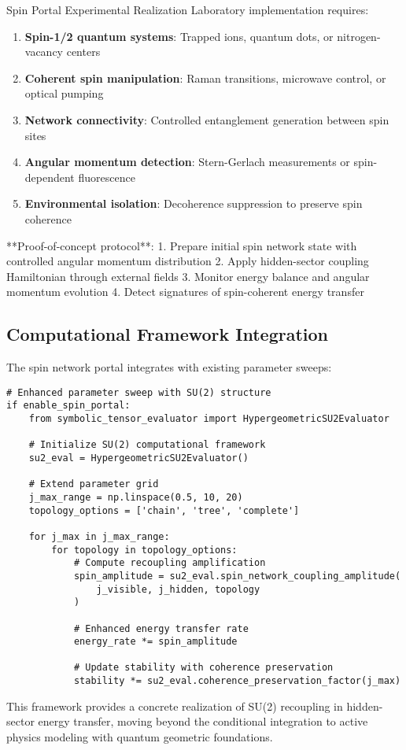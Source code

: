 \documentclass[12pt]{article}
\begin{document}
\begin{warningbox}{Spin Portal Experimental Realization}
Laboratory implementation requires:

\begin{enumerate}
\item \textbf{Spin-1/2 quantum systems}: Trapped ions, quantum dots, or nitrogen-vacancy centers
\item \textbf{Coherent spin manipulation}: Raman transitions, microwave control, or optical pumping
\item \textbf{Network connectivity}: Controlled entanglement generation between spin sites
\item \textbf{Angular momentum detection}: Stern-Gerlach measurements or spin-dependent fluorescence
\item \textbf{Environmental isolation}: Decoherence suppression to preserve spin coherence
\end{enumerate}

**Proof-of-concept protocol**:
1. Prepare initial spin network state with controlled angular momentum distribution
2. Apply hidden-sector coupling Hamiltonian through external fields
3. Monitor energy balance and angular momentum evolution
4. Detect signatures of spin-coherent energy transfer
\end{warningbox}

\subsection{Computational Framework Integration}

The spin network portal integrates with existing parameter sweeps:

\begin{verbatim}
# Enhanced parameter sweep with SU(2) structure
if enable_spin_portal:
    from symbolic_tensor_evaluator import HypergeometricSU2Evaluator
    
    # Initialize SU(2) computational framework
    su2_eval = HypergeometricSU2Evaluator()
    
    # Extend parameter grid
    j_max_range = np.linspace(0.5, 10, 20)
    topology_options = ['chain', 'tree', 'complete']
    
    for j_max in j_max_range:
        for topology in topology_options:
            # Compute recoupling amplification
            spin_amplitude = su2_eval.spin_network_coupling_amplitude(
                j_visible, j_hidden, topology
            )
            
            # Enhanced energy transfer rate
            energy_rate *= spin_amplitude
            
            # Update stability with coherence preservation
            stability *= su2_eval.coherence_preservation_factor(j_max)
\end{verbatim}

This framework provides a concrete realization of SU(2) recoupling in hidden-sector energy transfer, moving beyond the conditional integration to active physics modeling with quantum geometric foundations.



\end{document}
